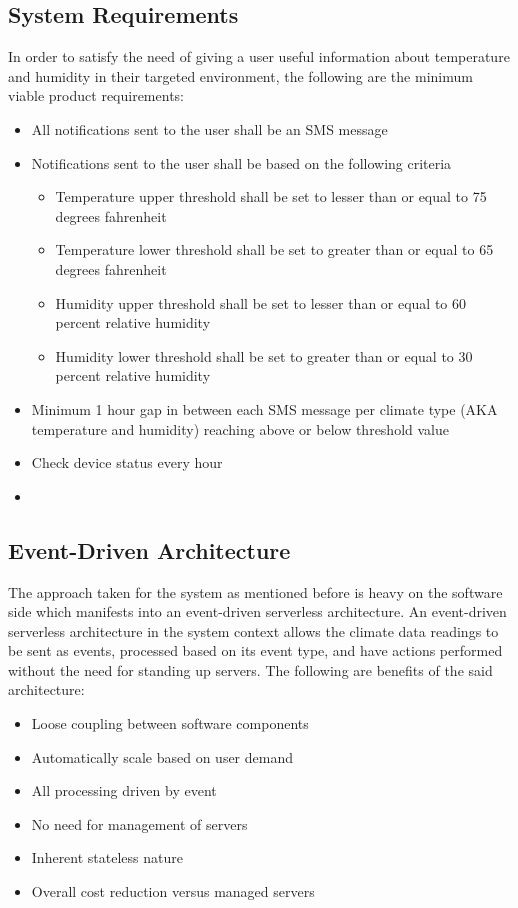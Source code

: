 \documentclass{article}
\begin{document}
\subsection{System Requirements}
In order to satisfy the need of giving a user useful information about temperature and humidity in their targeted environment, the following are the minimum viable product requirements:

\begin{itemize}
	\item All notifications sent to the user shall be an SMS message
	\item Notifications sent to the user shall be based on the following criteria
	      \begin{itemize}
		      \item Temperature upper threshold shall be set to lesser than or equal to 75 degrees fahrenheit
		      \item Temperature lower threshold shall be set to greater than or equal to 65 degrees fahrenheit
		      \item Humidity upper threshold shall be set to lesser than or equal to 60 percent relative humidity
		      \item Humidity lower threshold shall be set to greater than or equal to 30 percent relative humidity
	      \end{itemize}
	\item Minimum 1 hour gap in between each SMS message per climate type (AKA temperature and humidity) reaching above or below threshold value
	\item Check device status every hour
	\item
\end{itemize}

\subsection{Event-Driven Architecture}
The approach taken for the system as mentioned before is heavy on the software side which manifests into an event-driven serverless architecture. An event-driven serverless architecture in the system context allows the climate data readings to be sent as events, processed based on its event type, and have actions performed without the need for standing up servers. The following are benefits of the said architecture:

\begin{itemize}
	\item Loose coupling between software components
	\item Automatically scale based on user demand
	\item All processing driven by event
	\item No need for management of servers
	\item Inherent stateless nature
	\item Overall cost reduction versus managed servers
\end{itemize}
\end{document}
